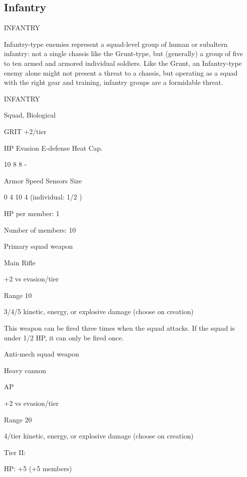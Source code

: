                                                                                                              

\subsection{Infantry}
                                               INFANTRY   

Infantry-type enemies represent a squad-level group of human or subaltern infantry: not a single  
chassis like the Grunt-type, but (generally) a group of five to ten armed and armored individual  
soldiers. Like the Grunt, an Infantry-type enemy alone might not present a threat to a chassis, but  
operating as a squad with the right gear and training, infantry groups are a formidable threat.    

       INFANTRY 

       Squad, Biological 

       GRIT +2/tier 

       HP         Evasion      E-defense     Heat Cap. 

       10         8            8             - 

       Armor      Speed       Sensors        Size 

       0          4            10            4 (individual:  
                                             1/2 ) 

HP per member: 1
 
Number of members: 10
 

Primary squad weapon
 
Main Rifle
 
+2 vs evasion/tier
 
Range 10
 
3/4/5 kinetic, energy, or explosive damage (choose on creation)
 
This weapon can be fired three times when the squad attacks. If the squad is under 1/2 HP, it can  
only be fired once.
 

Anti-mech squad weapon
 
Heavy cannon
 
AP
 
+2 vs evasion/tier
 
Range 20
 
4/tier kinetic, energy, or explosive damage (choose on creation)
 

Tier II:
 
HP: +5 (+5 members)
 

